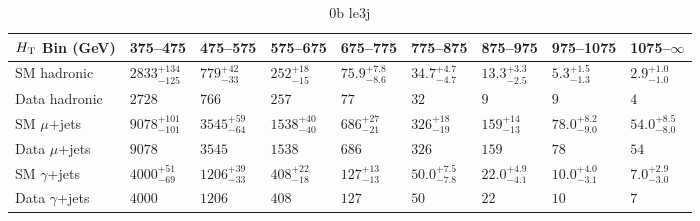 \documentclass[8pt]{article}
\def\scalht{\mbox{$H_{\rm{T}}$}\xspace}
\newcommand\T{\rule{0pt}{2.6ex}}
\newcommand\B{\rule[-1.2ex]{0pt}{0pt}}
\begin{document}
\begin{table}[ht!]
\caption{0b le3j}
\label{tab:ensemble-0b le3j}
\centering
\begin{tabular}{ lllllllll }

\hline
\scalht Bin (GeV)       & 375--475                       & 475--575                       & 575--675                       & 675--775                       & 775--875                       & 875--975                       & 975--1075                      & 1075--$\infty$                 \\ [1.000000ex]
\hline
SM hadronic\T           & $2833^{+134}_{-125}$           & $779^{+42}_{-33}$              & $252^{+18}_{-15}$              & $75.9^{+7.8}_{-8.6}$           & $34.7^{+4.7}_{-4.7}$           & $13.3^{+3.3}_{-2.5}$           & $5.3^{+1.5}_{-1.3}$            & $2.9^{+1.0}_{-1.0}$            \\ 
Data hadronic\B         & $2728$                         & $766$                          & $257$                          & $77$                           & $32$                           & $9$                            & $9$                            & $4$                            \\ 
\hline
SM $\mu$+jets\T         & $9078^{+101}_{-101}$           & $3545^{+59}_{-64}$             & $1538^{+40}_{-40}$             & $686^{+27}_{-21}$              & $326^{+18}_{-19}$              & $159^{+14}_{-13}$              & $78.0^{+8.2}_{-9.0}$           & $54.0^{+8.5}_{-8.0}$           \\ 
Data $\mu$+jets\B       & $9078$                         & $3545$                         & $1538$                         & $686$                          & $326$                          & $159$                          & $78$                           & $54$                           \\ 
\hline
SM $\gamma$+jets\T      & $4000^{+51}_{-69}$             & $1206^{+39}_{-33}$             & $408^{+22}_{-18}$              & $127^{+13}_{-13}$              & $50.0^{+7.5}_{-7.8}$           & $22.0^{+4.9}_{-4.1}$           & $10.0^{+4.0}_{-3.1}$           & $7.0^{+2.9}_{-3.0}$            \\ 
Data $\gamma$+jets\B    & $4000$                         & $1206$                         & $408$                          & $127$                          & $50$                           & $22$                           & $10$                           & $7$                            \\ 
\hline

\end{tabular}
\end{table}
\end{document}
